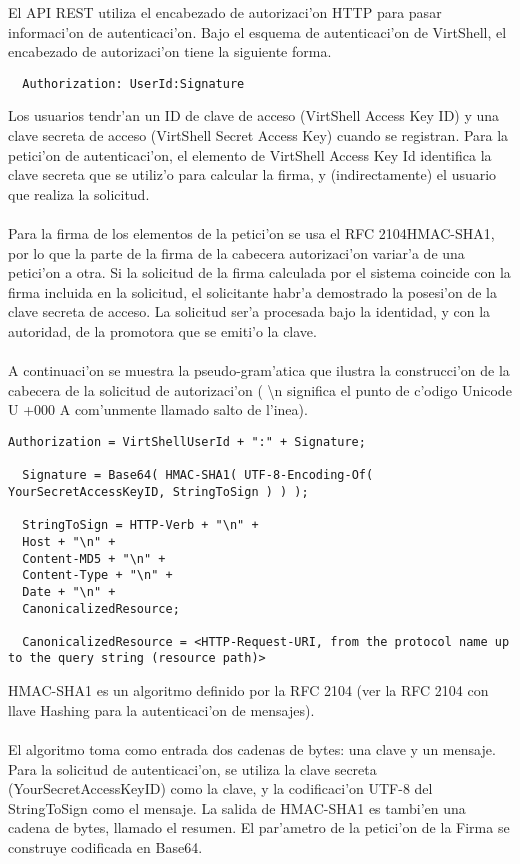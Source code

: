 El API REST utiliza el encabezado de autorizaci'on HTTP para pasar informaci'on de autenticaci'on. Bajo el esquema de autenticaci'on de VirtShell, el encabezado de autorizaci'on tiene la siguiente forma.

\medskip
\begin{lstlisting}
  Authorization: UserId:Signature
\end{lstlisting}
\medskip

Los usuarios tendr'an un ID de clave de acceso (VirtShell Access Key ID) y una clave secreta de acceso (VirtShell Secret Access Key) cuando se registran. Para la petici'on de autenticaci'on, el elemento de VirtShell Access Key Id identifica la clave secreta que se utiliz'o para calcular la firma, y (indirectamente) el usuario que realiza la solicitud.\\
\\
Para la firma de los elementos de la petici'on se usa el RFC 2104HMAC-SHA1, por lo que la parte de la firma de la cabecera autorizaci'on variar'a de una petici'on a otra. Si la solicitud de la firma calculada por el sistema coincide con la firma incluida en la solicitud, el solicitante habr'a demostrado la posesi'on de la clave secreta de acceso. La solicitud ser'a procesada bajo la identidad, y con la autoridad, de la promotora que se emiti'o la clave.\\
\\
A continuaci'on se muestra la pseudo-gram'atica que ilustra la construcci'on de la cabecera de la solicitud de autorizaci'on (
\textbackslash{}n significa el punto de c'odigo Unicode U +000 A com'unmente llamado salto de l'inea).

\medskip
\begin{lstlisting}[basicstyle=\tiny]
  Authorization = VirtShellUserId + ":" + Signature;

  Signature = Base64( HMAC-SHA1( UTF-8-Encoding-Of( YourSecretAccessKeyID, StringToSign ) ) );

  StringToSign = HTTP-Verb + "\n" +
  Host + "\n" +
  Content-MD5 + "\n" +
  Content-Type + "\n" +
  Date + "\n" +
  CanonicalizedResource;

  CanonicalizedResource = <HTTP-Request-URI, from the protocol name up to the query string (resource path)>
\end{lstlisting}

HMAC-SHA1 es un algoritmo definido por la RFC 2104 (ver la RFC 2104 con llave Hashing para la autenticaci'on de mensajes).\\
\\
El algoritmo toma como entrada dos cadenas de bytes: una clave y un mensaje. Para la solicitud de autenticaci'on, se utiliza la clave secreta (YourSecretAccessKeyID) como la clave, y la codificaci'on UTF-8 del StringToSign como el mensaje. La salida de HMAC-SHA1 es tambi'en una cadena de bytes, llamado el resumen. El par'ametro de la petici'on de la Firma se construye codificada en Base64.

